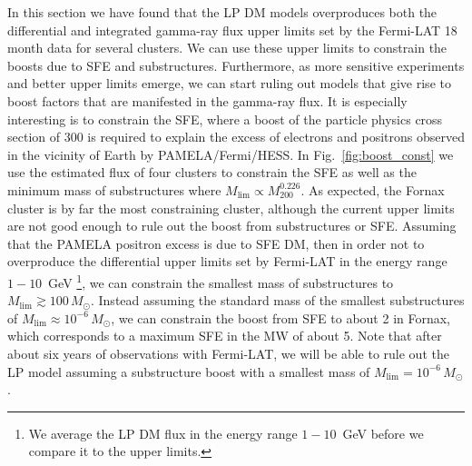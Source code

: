 \documentclass[10pt,aps,pra,reprint,amsmath,amsfonts,amssymb,showpacs,nofootinbib,floatfix]{revtex4-1}
\newcommand{\rmn}{\mathrm}
\newcommand{\msun}{M_\odot}
\newcommand{\mvir}{M_{200}}
\begin{document}
In this section we have found that the LP DM models overproduces both
the differential and integrated gamma-ray flux upper limits set by the
Fermi-LAT 18 month data for several clusters. We can use these upper
limits to constrain the boosts due to SFE and
substructures. Furthermore, as more sensitive experiments and better
upper limits emerge, we can start ruling out models that give rise to
boost factors that are manifested in the gamma-ray flux. It is
especially interesting is to constrain the SFE, where a boost of the
particle physics cross section of 300 is required to explain the
excess of electrons and positrons observed in the vicinity of Earth by
PAMELA/Fermi/HESS. In Fig.~\ref{fig:boost_const} we use the estimated
flux of four clusters to constrain the SFE as well as the minimum mass
of substructures where $M_\rmn{lim}\propto\mvir^{0.226}$. As expected,
the Fornax cluster is by far the most constraining cluster, although
the current upper limits are not good enough to rule out the boost
from substructures or SFE. Assuming that the PAMELA positron excess is
due to SFE DM, then in order not to overproduce the differential upper
limits set by Fermi-LAT in the energy range $1-10$~GeV \footnote{We
  average the LP DM flux in the energy range $1-10$~GeV before we
  compare it to the upper limits.}, we can constrain the smallest mass
of substructures to $M_\rmn{lim}\gtrsim 100\,\msun$. Instead assuming
the standard mass of the smallest substructures of $M_\rmn{lim}\approx
10^{-6}\,\msun$, we can constrain the boost from SFE to about 2 in
Fornax, which corresponds to a maximum SFE in the MW of about 5. Note
that after about six years of observations with Fermi-LAT, we will be
able to rule out the LP model assuming a substructure boost with a
smallest mass of $M_\rmn{lim} = 10^{-6}\,\msun$.
\end{document}
